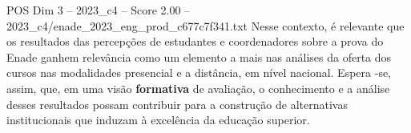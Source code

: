 \begin{textsample}{POS Dim 3 – 2023\_c4 – Score 2.00 – 2023\_c4/enade\_2023\_eng\_prod\_c677c7f341.txt}
Nesse contexto, é relevante que os resultados das percepções de estudantes e coordenadores sobre a prova do Enade ganhem relevância como um elemento a mais nas análises da oferta dos cursos nas modalidades presencial e a distância, em nível nacional.
Espera -se, assim, que, em uma visão \textbf{formativa} de avaliação, o conhecimento e a análise desses resultados possam contribuir para a construção de alternativas institucionais que induzam à excelência da educação superior.

\end{textsample}
